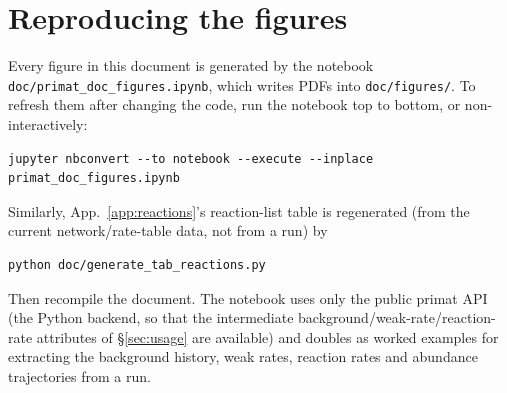 \documentclass[11pt,a4paper]{article}
\newcommand{\code}[1]{\texttt{#1}}
\begin{document}


\section{Reproducing the figures}
Every figure in this document is generated by the notebook
\code{doc/primat\_doc\_figures.ipynb}, which writes PDFs into
\code{doc/figures/}. To refresh them after changing the code, run the notebook
top to bottom, or non-interactively:
\begin{lstlisting}[style=sh]
jupyter nbconvert --to notebook --execute --inplace primat_doc_figures.ipynb
\end{lstlisting}
Similarly, App.~\ref{app:reactions}'s reaction-list table is regenerated (from
the current network/rate-table data, not from a run) by
\begin{lstlisting}[style=sh]
python doc/generate_tab_reactions.py
\end{lstlisting}
Then recompile the document. The notebook uses only the public primat API
(the Python backend, so that the intermediate background/weak-rate/reaction-rate
attributes of \S\ref{sec:usage} are available) and doubles as worked examples
for extracting the background history, weak rates, reaction rates and
abundance trajectories from a run.
\end{document}
